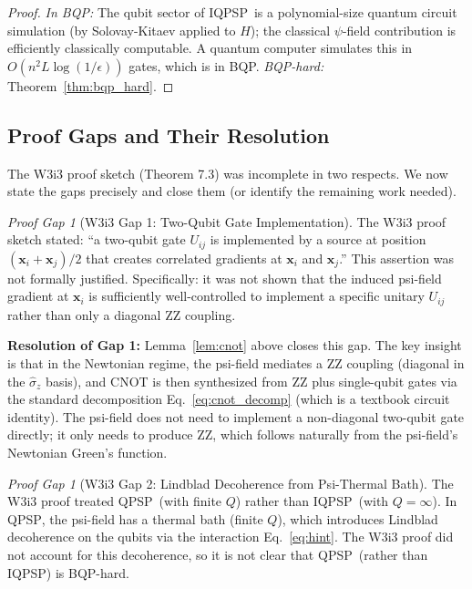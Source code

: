 \documentclass[11pt]{article}
\theoremstyle{definition}
\theoremstyle{remark}
\newtheorem{gap}[theorem]{Proof Gap}
\newcommand{\QPSP}{\textsc{QPSP}}
\newcommand{\IQPSP}{\textsc{IQPSP}}
\begin{document}
\begin{proof}
\textit{In BQP:} The qubit sector of \IQPSP\ is a polynomial-size
quantum circuit simulation (by Solovay-Kitaev applied to $H$);
the classical $\psi$-field contribution is efficiently classically
computable. A quantum computer simulates this in $O(n^2 L \log(1/\epsilon))$
gates, which is in BQP. \textit{BQP-hard:} Theorem~\ref{thm:bqp_hard}.
\end{proof}

\subsection{Proof Gaps and Their Resolution}
\label{sec:gaps}

The W3i3 proof sketch (Theorem 7.3) was incomplete in two respects.
We now state the gaps precisely and close them (or identify the remaining
work needed).

\begin{gap}[W3i3 Gap 1: Two-Qubit Gate Implementation]
\label{gap:two_qubit}
The W3i3 proof sketch stated: ``a two-qubit gate $U_{ij}$ is implemented
by a source at position $(\mathbf{x}_i+\mathbf{x}_j)/2$ that creates
correlated gradients at $\mathbf{x}_i$ and $\mathbf{x}_j$.'' This
assertion was not formally justified. Specifically: it was not shown
that the induced psi-field gradient at $\mathbf{x}_i$ is sufficiently
well-controlled to implement a specific unitary $U_{ij}$ rather than
only a diagonal ZZ coupling.
\end{gap}

\textbf{Resolution of Gap 1:} Lemma~\ref{lem:cnot} above closes this gap.
The key insight is that in the Newtonian regime, the psi-field mediates
a ZZ coupling (diagonal in the $\hat{\sigma}_z$ basis), and CNOT is then
synthesized from ZZ plus single-qubit gates via the standard
decomposition Eq.~\eqref{eq:cnot_decomp} (which is a textbook circuit
identity). The psi-field does not need to implement a non-diagonal
two-qubit gate directly; it only needs to produce ZZ, which follows
naturally from the psi-field's Newtonian Green's function.

\begin{gap}[W3i3 Gap 2: Lindblad Decoherence from Psi-Thermal Bath]
\label{gap:decoherence}
The W3i3 proof treated \QPSP\ (with finite $Q$) rather than \IQPSP\
(with $Q = \infty$). In \QPSP, the psi-field has a thermal bath
(finite $Q$), which introduces Lindblad decoherence on the qubits
via the interaction Eq.~\eqref{eq:hint}. The W3i3 proof did not
account for this decoherence, so it is not clear that \QPSP\
(rather than \IQPSP) is BQP-hard.
\end{gap}
\end{document}
